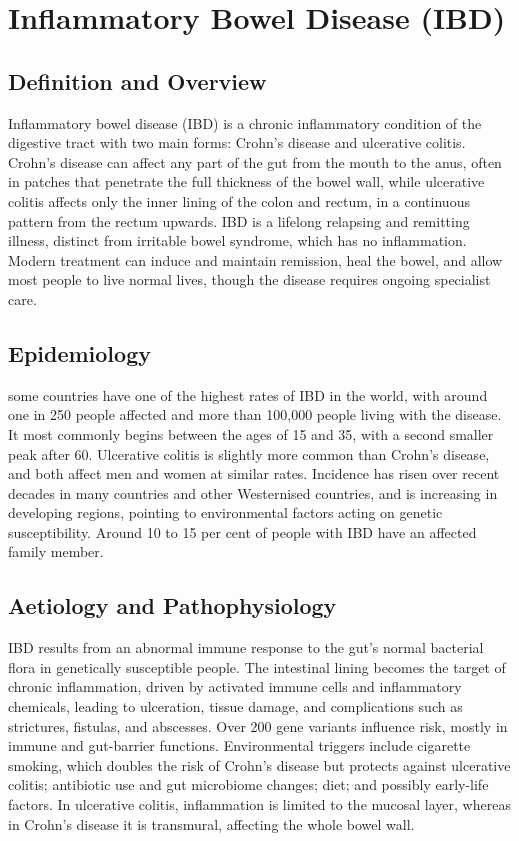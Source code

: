 \chapter{Inflammatory Bowel Disease (IBD)}

\section*{Definition and Overview}
Inflammatory bowel disease (IBD) is a chronic inflammatory condition of the digestive tract with two main forms: Crohn's disease and ulcerative colitis. Crohn's disease can affect any part of the gut from the mouth to the anus, often in patches that penetrate the full thickness of the bowel wall, while ulcerative colitis affects only the inner lining of the colon and rectum, in a continuous pattern from the rectum upwards. IBD is a lifelong relapsing and remitting illness, distinct from irritable bowel syndrome, which has no inflammation. Modern treatment can induce and maintain remission, heal the bowel, and allow most people to live normal lives, though the disease requires ongoing specialist care.

\section*{Epidemiology}
some countries have one of the highest rates of IBD in the world, with around one in 250 people affected and more than 100,000 people living with the disease. It most commonly begins between the ages of 15 and 35, with a second smaller peak after 60. Ulcerative colitis is slightly more common than Crohn's disease, and both affect men and women at similar rates. Incidence has risen over recent decades in many countries and other Westernised countries, and is increasing in developing regions, pointing to environmental factors acting on genetic susceptibility. Around 10 to 15 per cent of people with IBD have an affected family member.

\section*{Aetiology and Pathophysiology}
IBD results from an abnormal immune response to the gut's normal bacterial flora in genetically susceptible people. The intestinal lining becomes the target of chronic inflammation, driven by activated immune cells and inflammatory chemicals, leading to ulceration, tissue damage, and complications such as strictures, fistulas, and abscesses. Over 200 gene variants influence risk, mostly in immune and gut-barrier functions. Environmental triggers include cigarette smoking, which doubles the risk of Crohn's disease but protects against ulcerative colitis; antibiotic use and gut microbiome changes; diet; and possibly early-life factors. In ulcerative colitis, inflammation is limited to the mucosal layer, whereas in Crohn's disease it is transmural, affecting the whole bowel wall.

